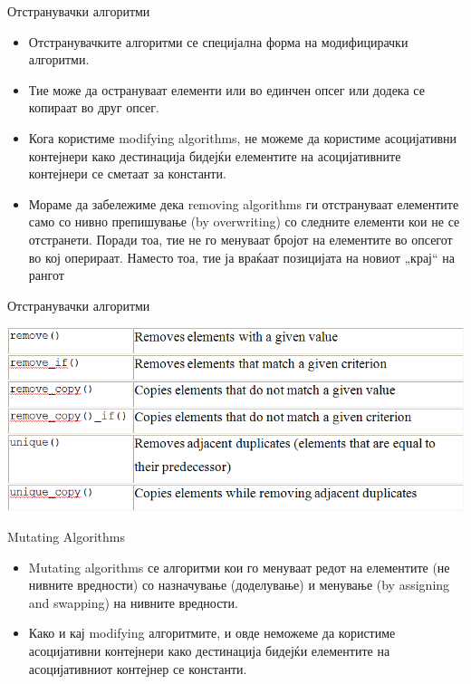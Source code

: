 \begin{frame}{Отстранувачки алгоритми}
\begin{itemize}
  \item Отстранувачките алгоритми се специјална форма на модифицирачки
  алгоритми. 
  \item Тие може да острануваат елементи или во единчен опсег или додека се
  копираат во друг опсег.
  \item Кога користиме modifying algorithms, не можеме да користиме асоцијативни
  контејнери како дестинација бидејќи елементите на асоцијативните контејнери се сметаат за константи.
  \item Мораме да забележиме дека removing algorithms ги отстрануваат елементите
  само со нивно препишување (by overwriting) со следните елементи кои не се
  отстранети. Поради тоа, тие не го менуваат бројот на елементите во опсегот во
  кој оперираат. Наместо тоа, тие ја враќаат позицијата на новиот „крај“ на
  рангот
\end{itemize}
\end{frame}

\begin{frame}{Отстранувачки алгоритми}
\begin{center}
\includegraphics[width=\textwidth]{images/removing}
\end{center}
\end{frame}

\begin{frame}{Mutating Algorithms}
\begin{itemize}
  \item Mutating algorithms се алгоритми кои го менуваат редот на елементите (не
  нивните вредности) со назначување (доделување) и менување (by assigning and
  swapping) на нивните вредности.
  \item Како и кај modifying алгоритмите, и овде неможеме да користиме асоцијативни
  контејнери како дестинација бидејќи елементите на асоцијативниот контејнер се константи.
\end{itemize}
\end{frame}

